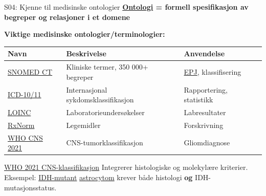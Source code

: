 \documentclass[aspectratio=169, 10pt]{beamer}
\begin{document}
\begin{frame}{S04: Kjenne til medisinske ontologier}
    \textbf{\href{https://en.wikipedia.org/wiki/Ontology_(information_science)}{Ontologi} = formell spesifikasjon av begreper og relasjoner i et domene}
    
    \vspace{0.3cm}
    \textbf{Viktige medisinske ontologier/terminologier:}
    \begin{center}
        \footnotesize
        \begin{tabular}{lp{5cm}l}
            \toprule
            \textbf{Navn} & \textbf{Beskrivelse} & \textbf{Anvendelse} \\
            \midrule
            \href{https://www.snomed.org/}{SNOMED CT} & Kliniske termer, 350 000+ begreper & \href{https://en.wikipedia.org/wiki/Electronic_health_record}{EPJ}, klassifisering \\
            \href{https://www.who.int/standards/classifications/classification-of-diseases}{ICD-10/11} & Internasjonal sykdomsklassifikasjon & Rapportering, statistikk \\
            \href{https://loinc.org/}{LOINC} & Laboratorieundersøkelser & Labresultater \\
            \href{https://www.nlm.nih.gov/research/umls/rxnorm/}{RxNorm} & Legemidler & Forskrivning \\
            \midrule
            \href{https://www.who.int/publications/i/item/9789240021310}{WHO CNS 2021} & CNS-tumorklassifikasjon & Gliomdiagnose \\
            \bottomrule
        \end{tabular}
    \end{center}
    
    \vspace{0.3cm}
    \begin{block}{\href{https://www.who.int/publications/i/item/9789240021310}{WHO 2021 CNS-klassifikasjon}}
        Integrerer histologiske og molekylære kriterier. Eksempel: \href{https://en.wikipedia.org/wiki/IDH1}{IDH-mutant} \href{https://en.wikipedia.org/wiki/Astrocytoma}{astrocytom} krever både histologi \textbf{og} IDH-mutasjonsstatus.
    \end{block}
\end{frame}
\end{document}
